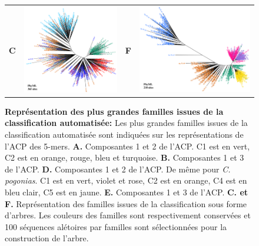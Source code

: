 \documentclass[12pt,a4paper]{article}
\begin{document}
\begin{figure}
\begin{tabular}{cc|cc}
		\textbf{C} & \includegraphics[scale=0.25]{img/tree_solatus.png} & \textbf{F} & \includegraphics[scale=0.25]{img/tree_pogonias.png} \\
	\end{tabular}
	\caption{\textbf{Représentation des plus grandes familles issues de la classification automatisée:} Les plus grandes familles issues de la classification automatisée sont indiquées sur les représentations de l'ACP des 5-mers.
	\textbf{A.} Composantes 1 et 2 de l'ACP. C1 est en vert, C2 est en orange, rouge, bleu et turquoise.  			\textbf{B.} Composantes 1 et 3 de l'ACP. 
	\textbf{D.} Composantes 1 et 2 de l'ACP. De même pour \textit{C. pogonias}. C1 est en vert, violet et rose, C2 est en orange, C4 est en bleu clair, C5 est en jaune.
	\textbf{E.} Composantes 1 et 3 de l'ACP.
	\textbf{C. et F.} Représentation des familles issues de la classification sous forme d'arbres. Les couleurs des familles sont respectivement conservées et 100 séquences alétoires par familles sont sélectionnées pour la construction de l'arbre. 	 
	\label{fig:so_po_acp_tree}
		} 
\end{figure}
			
\end{document}
